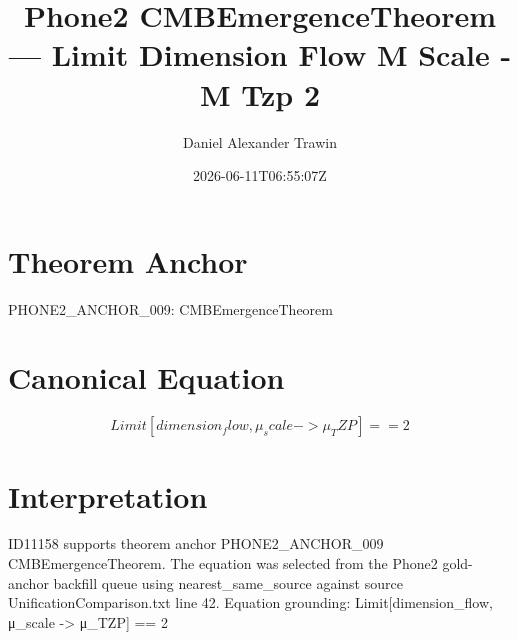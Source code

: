 \documentclass[11pt]{article}
\title{Phone2 CMBEmergenceTheorem — Limit Dimension Flow Μ Scale - Μ Tzp 2}
\author{Daniel Alexander Trawin}
\date{2026-06-11T06:55:07Z}
\begin{document}
\maketitle
\section*{Theorem Anchor}
PHONE2_ANCHOR_009: CMBEmergenceTheorem
\section*{Canonical Equation}
\[
Limit[dimension_flow, μ_scale -> μ_TZP] == 2
\]
\section*{Interpretation}
ID11158 supports theorem anchor PHONE2_ANCHOR_009 CMBEmergenceTheorem. The equation was selected from the Phone2 gold-anchor backfill queue using nearest_same_source against source UnificationComparison.txt line 42. Equation grounding: Limit[dimension_flow, μ_scale -> μ_TZP] == 2
\end{document}
